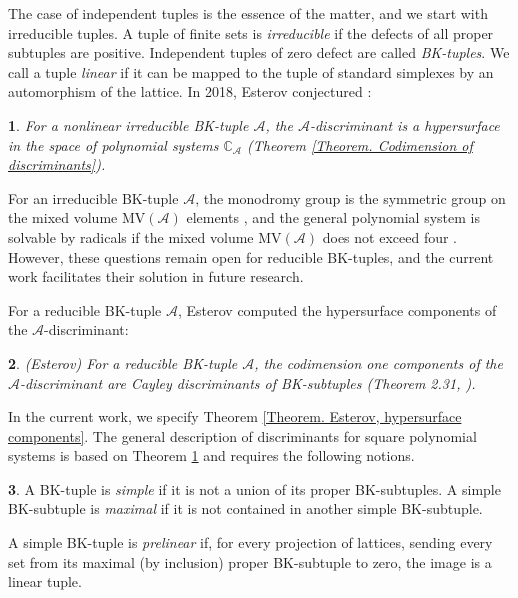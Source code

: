 \documentclass[11pt]{article}
\theoremstyle{plain}
\newtheorem{thm}{\protect\theoremname}[section]
\theoremstyle{definition}
\newtheorem{defn}[thm]{\protect\definitionname}
\theoremstyle{remark}
\theoremstyle{plain}
\theoremstyle{plain}
\theoremstyle{plain}
\theoremstyle{definition}
\providecommand{\definitionname}{Definition}
\providecommand{\theoremname}{Theorem}
\begin{document}
The case of independent tuples is the essence of the matter, and we
start with irreducible tuples. A tuple of finite sets is \textit{irreducible}
if the defects of all proper subtuples are positive. Independent tuples
of zero defect are called \textit{BK-tuples}. We call a tuple \textit{linear}
if it can be mapped to the tuple of standard simplexes by an automorphism
of the lattice. In 2018, Esterov conjectured \cite{esterov_galois_2019}:
\begin{thm}
\label{Theorem. Esterov conjecture}For a nonlinear irreducible BK-tuple
$\mathscr{A}$, the $\mathscr{A}$-discriminant is a hypersurface
in the space of polynomial systems $\mathbb{C}_{\mathscr{A}}$ \textup{(Theorem
\ref{Theorem. Codimension of discriminants})}.
\end{thm}

For an irreducible BK-tuple $\mathscr{A}$, the monodromy group is
the symmetric group on the mixed volume $\mathrm{MV}(\mathscr{A})$
elements \cite{esterov_galois_2019}, and the general polynomial system
is solvable by radicals if the mixed volume $\mathrm{MV}(\mathscr{A})$
does not exceed four \cite{esterov_multivariate_2016}. However, these
questions remain open for reducible BK-tuples, and the current work
facilitates their solution in future research.

For a reducible BK-tuple $\mathscr{A}$, Esterov computed the hypersurface
components of the $\mathscr{A}$-discriminant:
\begin{thm}
\textup{(Esterov)\label{Theorem. Esterov, hypersurface components}}
For a reducible BK-tuple $\mathscr{A}$, the codimension one components
of the $\mathscr{A}$-discriminant are Cayley discriminants of BK-subtuples
\textup{(Theorem 2.31, \cite{esterov_newton_2010})}.
\end{thm}

In the current work, we specify Theorem \ref{Theorem. Esterov, hypersurface components}.
The general description of discriminants for square polynomial systems
is based on Theorem \ref{Theorem. Esterov conjecture} and requires
the following notions.
\begin{defn}
A BK-tuple is \textit{simple} if it is not a union of its proper BK-subtuples.
A simple BK-subtuple is \textit{maximal} if it is not contained in
another simple BK-subtuple.

A simple BK-tuple is\textit{ prelinear} if, for every projection of
lattices, sending every set from its maximal (by inclusion) proper
BK-subtuple to zero, the image is a linear tuple.
\end{defn}
\end{document}
